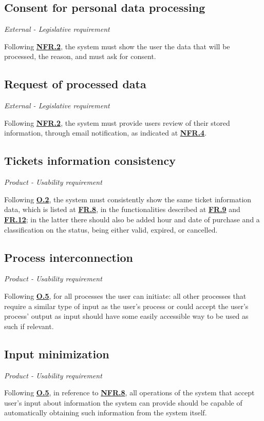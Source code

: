 \documentclass[12pt]{article}
\renewcommand\bf[1]{\textbf{#1}}
\renewcommand\it[1]{\textit{#1}}
\newcommand\hyl[1]{\hyperref[#1]{\bf{#1}}}
\begin{document}
\subsection{Consent for personal data processing} \label{NFR.5}
\it{External - Legislative requirement}

Following \hyl{NFR.2}, the system must show the user the data that will be processed, the reason, and must ask for consent.

\subsection{Request of processed data} \label{NFR.6}
\it{External - Legislative requirement}

Following \hyl{NFR.2}, the system must provide users review of their stored information, through email notification, as indicated at \hyl{NFR.4}.

\subsection{Tickets information consistency} \label{NFR.7}
\it{Product - Usability requirement}

Following \hyl{O.2}, the system must consistently show the same ticket information data, which is listed at \hyl{FR.8}, in the functionalities described at \hyl{FR.9} and \hyl{FR.12}; in the latter there should also be added hour and date of purchase and a classification on the status, being either valid, expired, or cancelled.

\subsection{Process interconnection} \label{NFR.8}
\it{Product - Usability requirement}

Following \hyl{O.5}, for all processes the user can initiate: all other processes that require a similar type of input as the user's process or could accept the user's process' output as input should have some easily accessible way to be used as such if relevant.

\subsection{Input minimization} \label{NFR.9}
\it{Product - Usability requirement}

Following \hyl{O.5}, in reference to \hyl{NFR.8}, all operations of the system that accept user's input about information the system can provide should be capable of automatically obtaining such information from the system itself.
\end{document}
